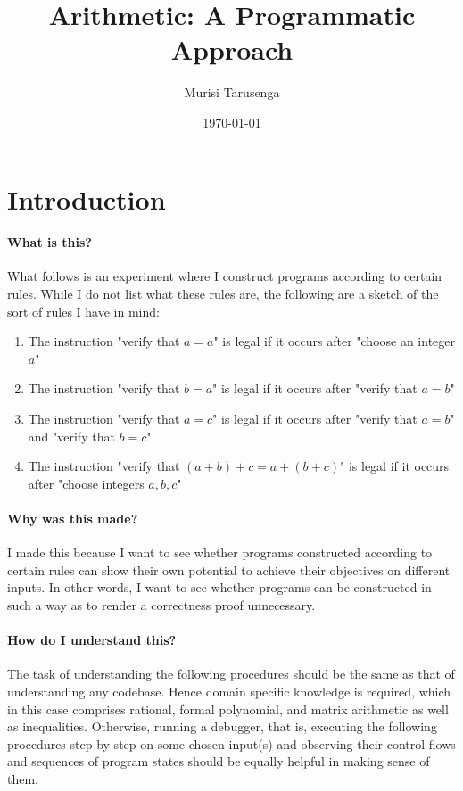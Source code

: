 \documentclass[twocolumn]{article}
\begin{document}
	\title{Arithmetic: A Programmatic Approach}
	\author{Murisi Tarusenga}
	\date{\today{} \currenttime}
	\maketitle
	\section{Introduction}
		\paragraph{What is this?}
			What follows is an experiment where I construct programs according to certain rules. While I do not list what these rules are, the following are a sketch of the sort of rules I have in mind:
			\begin{enumerate}
				\item The instruction "verify that $a=a$" is legal if it occurs after "choose an integer $a$"
				\item The instruction "verify that $b=a$" is legal if it occurs after "verify that $a=b$"
				\item The instruction "verify that $a=c$" is legal if it occurs after "verify that $a=b$" and "verify that $b=c$"
				\item The instruction "verify that $(a+b)+c=a+(b+c)$" is legal if it occurs after "choose integers $a,b,c$"
			\end{enumerate}
		\paragraph{Why was this made?}
			I made this because I want to see whether programs constructed according to certain rules can show their own potential to achieve their objectives on different inputs. In other words, I want to see whether programs can be constructed in such a way as to render a correctness proof unnecessary.
		\paragraph{How do I understand this?}
			The task of understanding the following procedures should be the same as that of understanding any codebase. Hence domain specific knowledge is required, which in this case comprises rational, formal polynomial, and matrix arithmetic as well as inequalities. Otherwise, running a debugger, that is, executing the following procedures step by step on some chosen input(s) and observing their control flows and sequences of program states should be equally helpful in making sense of them.
	\tableofcontents
\end{document}
